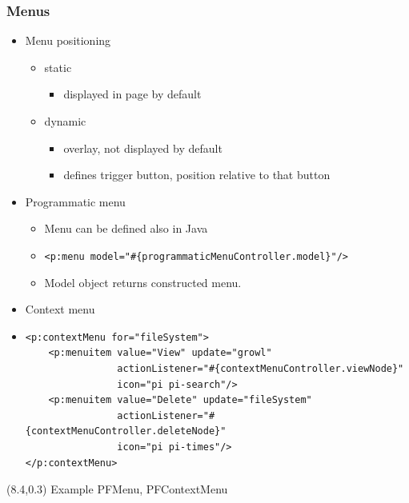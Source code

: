 \documentclass[10pt,xcolor=pdflatex]{beamer}
\begin{document}
\begin{frame}[containsverbatim]\frametitle{Menus}
  \begin{itemize}
    \item Menu positioning
 	  \begin{itemize}
        \item static
          \begin{itemize}
            \item displayed in page by default
          \end{itemize}
        \item dynamic
          \begin{itemize}
            \item overlay, not displayed by default
	        \item defines trigger button, position relative to that button
          \end{itemize}
	  \end{itemize}
	\item Programmatic menu
      \begin{itemize}
    	\item Menu can be defined also in Java
        \item[] \verb;<p:menu model="#{programmaticMenuController.model}"/>;
        \item Model object returns constructed menu.
      \end{itemize}
    \item Context menu
    \item[] \begin{footnotesize} \begin{verbatim}
<p:contextMenu for="fileSystem">
    <p:menuitem value="View" update="growl"
                actionListener="#{contextMenuController.viewNode}"
                icon="pi pi-search"/>
    <p:menuitem value="Delete" update="fileSystem"
                actionListener="#{contextMenuController.deleteNode}" 
                icon="pi pi-times"/>
</p:contextMenu>
\end{verbatim} \end{footnotesize}
  \end{itemize}
\begin{textblock}{10}(8.4,0.3)
    {\footnotesize Example PFMenu, PFContextMenu}
\end{textblock}
\end{frame}
\end{document}
